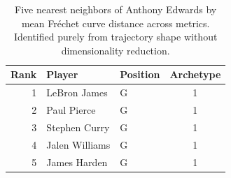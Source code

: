 \begin{table}[htbp]
  \centering\small
  \begin{tabular}{rllc}
    \toprule
    Rank & Player & Position & Archetype \\
    \midrule
    1 & LeBron James & G & 1 \\
    2 & Paul Pierce & G & 1 \\
    3 & Stephen Curry & G & 1 \\
    4 & Jalen Williams & G & 1 \\
    5 & James Harden & G & 1 \\
    \bottomrule
  \end{tabular}
  \caption{Five nearest neighbors of Anthony Edwards by mean Fr\'{e}chet curve distance across metrics. Identified purely from trajectory shape without dimensionality reduction.}
  \label{tab:Anthony_Edwards_frechet_curve_neighbors}
\end{table}

